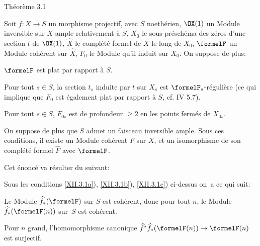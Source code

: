 \setcounter{equation}{16}%
\label{XII.3.1}%
\begin{enonce*}{Th\'eor\`eme 3.1\ndemark}

Soit $f:X\to S$ un morphisme projectif, avec $S$ noeth\'erien, $\OX(1)$ un Module inversible sur $X$ ample relativement \`a $S$, $X_0$ le sous-pr\'esch\'ema des z\'eros d'une section $t$ de $\OX(1)$, $\widehat{X}$ le compl\'et\'e formel de $X$ le long de $X_0$, $\formelF$ un Module coh\'erent sur $\widehat{X}$, $F_0$ le Module qu'il induit sur $X_0$. On suppose de plus:
\begin{enumeratea}
\item\label{XII.3.1a}
$\formelF$ est plat par rapport \`a $S$.
\item\label{XII.3.1b}
Pour tout $s\in S$, la section $t_s$ induite par $t$ sur $X_s$ est $\formelF_s$-r\'eguli\`ere (ce qui implique que $F_0$ est \'egalement plat par rapport \`a $S$, cf. \textup{ IV 5.7}).
\item\label{XII.3.1c}
Pour tout $s\in S$, $F_{0s}$ est de profondeur $\geq 2$ en les points ferm\'es de $X_{0s}$.
\end{enumeratea}
On suppose de plus que $S$ admet un faisceau inversible ample. Sous ces conditions, il existe un Module coh\'erent $F$ sur $X$, et un isomorphisme de son compl\'et\'e formel $\widehat{F}$ avec $\formelF$.
\end{enonce*}

Cet \'enonc\'e va r\'esulter du suivant:

\begin{corollaire} \label{XII.3.2}
Sous les conditions \ref{XII.3.1a}), \ref{XII.3.1b}), \ref{XII.3.1c}) ci-dessus on~a ce qui suit:
\begin{enumeratei}
\item
Le Module $\widehat{f}_\ast(\formelF)$ sur $S$ est coh\'erent, donc pour tout $n$, le Module $\widehat{f}_\ast(\formelF(n))$ sur~$S$ est coh\'erent.
\item
Pour $n$ grand, l'homomorphisme canonique $\widehat{f}^\ast\widehat{f}_\ast(\formelF(n))\to \formelF(n)$ est surjectif.
\end{enumeratei}
\end{corollaire}

